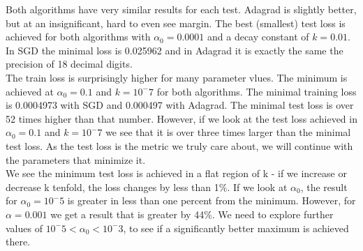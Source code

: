 \documentclass[12pt]{scrartcl}
\begin{document}
Both algorithms have very similar results for each test. Adagrad is slightly better, but at an insignificant, hard to even see margin. The best (smallest) test loss is achieved for both algorithms with $\alpha_0 = 0.0001$ and a decay constant of $k=0.01$. In SGD the minimal loss is 0.025962 and in Adagrad it is exactly the same the precision of 18 decimal digits.\\
The train loss is surprisingly higher for many parameter vlues. The minimum is achieved at $\alpha_0=0.1$ and $k=10^-7$ for both algorithms. The minimal training loss is 0.0004973 with SGD and 0.000497 with Adagrad. The minimal test loss is over 52 times higher than that number. However, if we look at the test loss achieved in $\alpha_0=0.1$ and $k=10^-7$ we see that it is over three times larger than the minimal test loss. As the test loss is the metric we truly care about, we will continue with the parameters that minimize it.\\
We see the minimum test loss is achieved in a flat region of k - if we increase or decrease k tenfold, the loss changes by less than 1\%. If we look at $\alpha_0$, the result for $\alpha_0=10^-5$ is greater in less than one percent from the minimum. However, for $\alpha=0.001$ we get a result that is greater by 44\%. We need to explore further values of $10^-5 < \alpha_0 < 10^-3$, to see if a significantly better maximum is achieved there.
\end{document}
